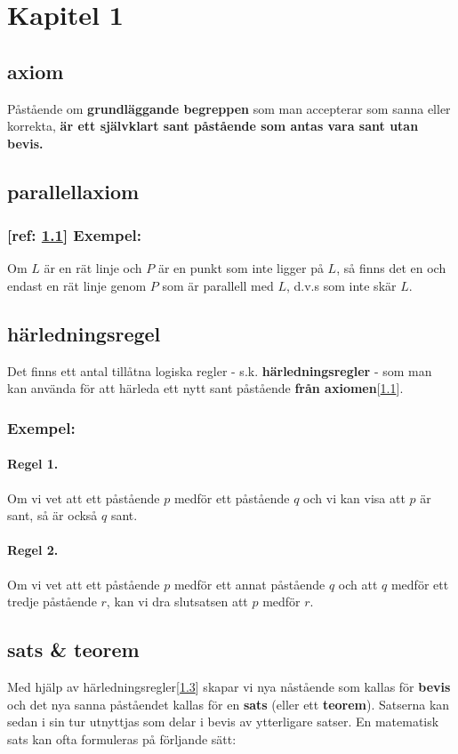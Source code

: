 \section{Kapitel 1} 
\subsection{axiom}\label{axiom} 
    \textbf{\cite{axiom}} Påstående om \textbf{grundläggande begreppen} som man accepterar som sanna eller korrekta, \textbf{är ett självklart sant påstående som antas vara sant utan bevis.}
\subsection{parallellaxiom}\label{parallellaxiom} 
    \subsubsection{\textbf{[ref: \ref{axiom}]} Exempel:}
    Om $L$ är en rät linje och $P$ är en punkt som inte ligger på $L$, så finns det en och endast en rät linje genom $P$ som är parallell med $L$, d.v.s som inte skär $L$.
\subsection{härledningsregel}\label{härledningsregel}
    \textbf{\cite{härledningsregel}} Det finns ett antal tillåtna logiska regler - s.k. \textbf{härledningsregler} - som man kan använda för att härleda ett nytt sant påstående \textbf{från axiomen}[\ref{axiom}].
    \subsubsection{Exempel:}
        \paragraph{Regel 1.}
            Om vi vet att ett påstående $p$ medför ett påstående $q$ och vi kan visa att $p$ är sant, så är också $q$ sant.
        \paragraph{Regel 2.}
            Om vi vet att ett påstående $p$ medför ett annat påstående $q$ och att $q$ medför ett tredje påstående $r$, kan vi dra slutsatsen att $p$ medför $r$.
\subsection{sats \& teorem}\label{sats}
    \textbf{\cite{sats}} Med hjälp av härledningsregler[\ref{härledningsregel}] skapar vi nya nåstående som kallas för \textbf{bevis} och det nya sanna påståendet kallas för en \textbf{sats} (eller ett \textbf{teorem}). Satserna kan sedan i sin tur utnyttjas som delar i bevis av ytterligare satser. En matematisk sats kan ofta formuleras på förljande sätt:
